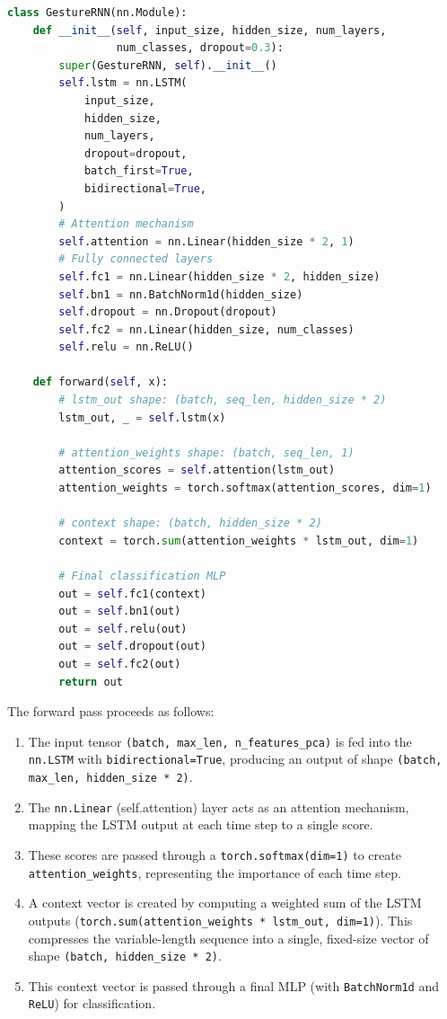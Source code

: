 \documentclass[]{IEEEphot}
\begin{document}
\begin{lstlisting}[language=Python, caption={GestureRNN (BiLSTM+Attention) class definition.}, label={lst:bilstm}, captionpos=t]
class GestureRNN(nn.Module):
    def __init__(self, input_size, hidden_size, num_layers, 
                 num_classes, dropout=0.3):
        super(GestureRNN, self).__init__()
        self.lstm = nn.LSTM(
            input_size,
            hidden_size,
            num_layers,
            dropout=dropout,
            batch_first=True,
            bidirectional=True,
        )
        # Attention mechanism
        self.attention = nn.Linear(hidden_size * 2, 1)
        # Fully connected layers
        self.fc1 = nn.Linear(hidden_size * 2, hidden_size)
        self.bn1 = nn.BatchNorm1d(hidden_size)
        self.dropout = nn.Dropout(dropout)
        self.fc2 = nn.Linear(hidden_size, num_classes)
        self.relu = nn.ReLU()

    def forward(self, x):
        # lstm_out shape: (batch, seq_len, hidden_size * 2)
        lstm_out, _ = self.lstm(x)
        
        # attention_weights shape: (batch, seq_len, 1)
        attention_scores = self.attention(lstm_out)
        attention_weights = torch.softmax(attention_scores, dim=1)
        
        # context shape: (batch, hidden_size * 2)
        context = torch.sum(attention_weights * lstm_out, dim=1)
        
        # Final classification MLP
        out = self.fc1(context)
        out = self.bn1(out)
        out = self.relu(out)
        out = self.dropout(out)
        out = self.fc2(out)
        return out
\end{lstlisting}

The forward pass proceeds as follows:
\begin{enumerate}
    \item The input tensor \texttt{(batch, max\_len, n\_features\_pca)} is fed into the \texttt{nn.LSTM} with \texttt{bidirectional=True}, producing an output of shape \texttt{(batch, max\_len, hidden\_size * 2)}.
    \item The \texttt{nn.Linear} (self.attention) layer acts as an attention mechanism, mapping the LSTM output at each time step to a single score.
    \item These scores are passed through a \texttt{torch.softmax(dim=1)} to create \texttt{attention\_weights}, representing the importance of each time step.
    \item A context vector is created by computing a weighted sum of the LSTM outputs (\texttt{torch.sum(attention\_weights * lstm\_out, dim=1)}). This compresses the variable-length sequence into a single, fixed-size vector of shape \texttt{(batch, hidden\_size * 2)}.
    \item This context vector is passed through a final MLP (with \texttt{BatchNorm1d} and \texttt{ReLU}) for classification.
\end{enumerate}
\end{document}
